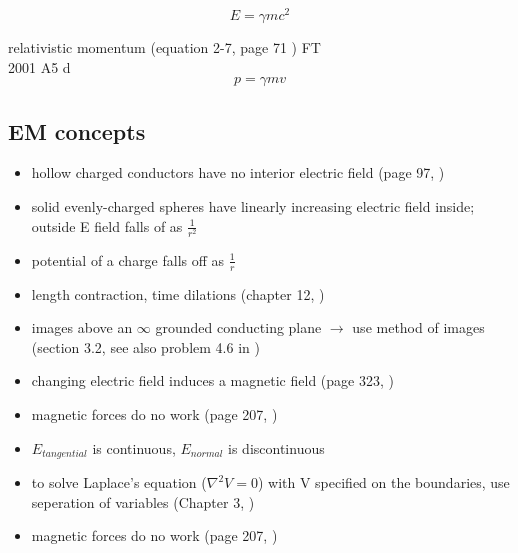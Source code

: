 \documentclass[12pt]{article}  %
\def\qualifyingyear{F}
\begin{document}
\begin{equation}
  E = \gamma m c^2
	\label{eq:Einsteins_energy}
\end{equation}


relativistic momentum (equation 2-7, page 71 \cite{TiplerMP}) 
\if\qualifyingyear T
\\ 
2001 A5 d
\fi
\begin{equation}
  p = \gamma m v
  \label{eq:relativistic_momentum}
\end{equation}

\subsection{EM concepts}
\begin{itemize}
	\item hollow charged conductors have no interior electric field (page 97, \cite{GriffithED})
	\item solid evenly-charged spheres have linearly increasing electric field inside;
	outside E field falls of as $\frac{1}{r^2}$
	\item potential of a charge falls off as $\frac{1}{r}$
	\item length contraction, time dilations (chapter 12, \cite{GriffithED})
	\item images above an $\infty$ grounded conducting plane $\rightarrow$ use method of images 
	(section 3.2, see also problem 4.6 in \cite{GriffithED})
	\item changing electric field induces a magnetic field (page 323, \cite{GriffithED})
	\item magnetic forces do no work (page 207, \cite{GriffithED})
	\item $E_{tangential}$ is continuous, $E_{normal}$ is discontinuous
	\item to solve Laplace's equation ($\nabla^2 V = 0$) with V specified on the
	boundaries, use seperation of variables (Chapter 3, \cite{GriffithED})
	\item magnetic forces do no work (page 207, \cite{GriffithED})
\end{itemize}

\end{document}
